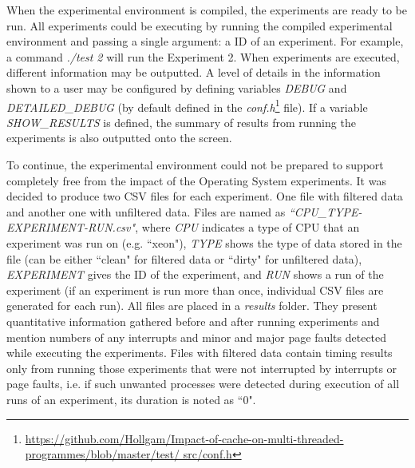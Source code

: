 When the experimental environment is compiled, the experiments are ready to be run. All experiments could be executing by running the compiled experimental environment and passing a single argument: a ID of an experiment. For example, a command \textit{./test 2} will run the Experiment 2. When experiments are executed, different information may be outputted. A level of details in the information shown to a user may be configured by defining variables \textit{DEBUG} and \textit{DETAILED\_DEBUG} (by default defined in the \textit{conf.h}\footnote{\url{https://github.com/Hollgam/Impact-of-cache-on-multi-threaded-programmes/blob/master/test/
src/conf.h}} file). If a variable \textit{SHOW\_RESULTS} is defined, the summary of results from running the experiments is also outputted onto the screen. 

To continue, the experimental environment could not be prepared to support completely free from the impact of the Operating System experiments. It was decided to produce two CSV files for each experiment. One file with filtered data and another one with unfiltered data. Files are named as \textit{``CPU\_TYPE-EXPERIMENT-RUN.csv"}, where \textit{CPU} indicates a type of CPU that an experiment was run on (e.g. ``xeon"), \textit{TYPE} shows the type of data stored in the file (can be either ``clean" for filtered data or ``dirty" for unfiltered data), \textit{EXPERIMENT} gives the ID of the experiment, and \textit{RUN} shows a run of the experiment (if an experiment is run more than once, individual CSV files are generated for each run). All files are placed in a \textit{results} folder. They present quantitative information gathered before and after running experiments and mention numbers of any interrupts and minor and major page faults detected while executing the experiments. Files with filtered data contain timing results only from running those experiments that were not interrupted by interrupts or page faults, i.e. if such unwanted processes were detected during execution of all runs of an experiment, its duration is noted as ``0".

\begin{table}
\caption{A sample of a CSV file with filtered data}
\centering 
{}
\label{csvTable}
\end{table}

